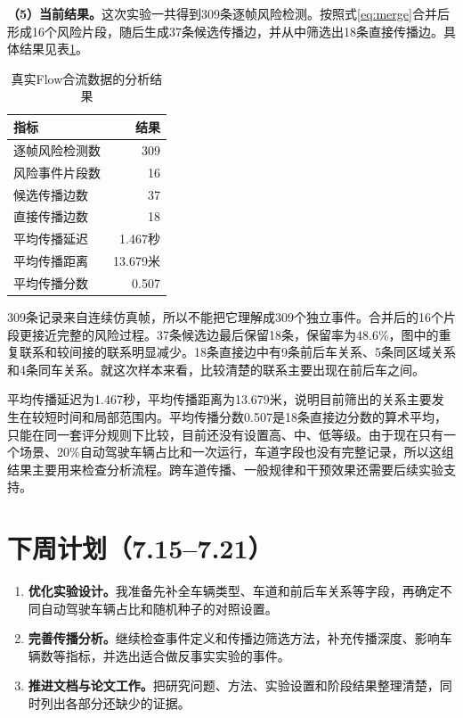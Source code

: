 \documentclass[UTF8,zihao=5,a4paper]{ctexart}
\begin{document}
\textbf{（5）当前结果。}这次实验一共得到309条逐帧风险检测。按照式\eqref{eq:merge}合并后形成16个风险片段，随后生成37条候选传播边，并从中筛选出18条直接传播边。具体结果见表\ref{tab:results}。

\begin{table}[H]
\centering
\caption{真实Flow合流数据的分析结果}
\label{tab:results}
\begin{tabular}{lr}
\toprule
指标 & 结果 \\
\midrule
逐帧风险检测数 & 309 \\
风险事件片段数 & 16 \\
候选传播边数 & 37 \\
直接传播边数 & 18 \\
平均传播延迟 & 1.467秒 \\
平均传播距离 & 13.679米 \\
平均传播分数 & 0.507 \\
\bottomrule
\end{tabular}
\end{table}

309条记录来自连续仿真帧，所以不能把它理解成309个独立事件。合并后的16个片段更接近完整的风险过程。37条候选边最后保留18条，保留率为48.6\%，图中的重复联系和较间接的联系明显减少。18条直接边中有9条前后车关系、5条同区域关系和4条同车关系。就这次样本来看，比较清楚的联系主要出现在前后车之间。

平均传播延迟为1.467秒，平均传播距离为13.679米，说明目前筛出的关系主要发生在较短时间和局部范围内。平均传播分数0.507是18条直接边分数的算术平均，只能在同一套评分规则下比较，目前还没有设置高、中、低等级。由于现在只有一个场景、20\%自动驾驶车辆占比和一次运行，车道字段也没有完整记录，所以这组结果主要用来检查分析流程。跨车道传播、一般规律和干预效果还需要后续实验支持。

\section{下周计划（7.15--7.21）}

\begin{enumerate}
\item \textbf{优化实验设计。}我准备先补全车辆类型、车道和前后车关系等字段，再确定不同自动驾驶车辆占比和随机种子的对照设置。
\item \textbf{完善传播分析。}继续检查事件定义和传播边筛选方法，补充传播深度、影响车辆数等指标，并选出适合做反事实实验的事件。
\item \textbf{推进文档与论文工作。}把研究问题、方法、实验设置和阶段结果整理清楚，同时列出各部分还缺少的证据。
\end{enumerate}
\end{document}
